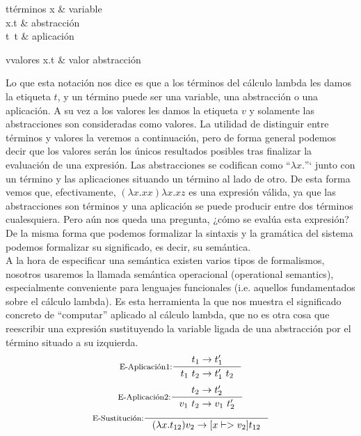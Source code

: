 \begin{grammar}{t}{términos}
x             & variable \\
\lambda x.t     & abstracción \\
t\ t           & aplicación
\end{grammar}

\begin{grammar}{v}{valores}
\lambda x.t     & valor abstracción
\end{grammar}

\bigskip

Lo que esta notación nos dice es que a los términos del cálculo lambda les damos la etiqueta $t$, y un término puede ser una variable, una abstracción o una aplicación.
A su vez a los valores les damos la etiqueta $v$ y solamente las abstracciones son consideradas como valores.
La utilidad de distinguir entre términos y valores la veremos a continuación, pero de forma general podemos decir que los valores serán los únicos resultados posibles
tras finalizar la evaluación de una expresión.
Las abstracciones se codifican como ``$\lambda x.$''` junto con un término y las aplicaciones situando un término al lado de otro. De esta forma vemos que, efectivamente, $(\lambda x.xx) \lambda x.xz$ es una expresión válida, ya que las abstracciones son términos y una aplicación se puede producir entre dos términos cualesquiera. Pero aún nos queda una pregunta, ¿cómo se evalúa esta expresión? De la misma forma que podemos formalizar la sintaxis y la gramática del sistema podemos formalizar su significado, es decir, su semántica.\\

A la hora de especificar una semántica existen varios tipos de formalismos, nosotros usaremos la llamada semántica operacional (operational semantics), especialmente conveniente para lenguajes funcionales (i.e. aquellos fundamentados sobre el cálculo lambda). Es esta herramienta la que nos muestra el significado concreto de ``computar'' aplicado al cálculo lambda, que no es otra cosa que reescribir una expresión sustituyendo la variable ligada de una abstracción por el término situado a su izquierda.\\

\[
\inference[E-Aplicación1:]{t_1 -> t_1'}{t_1\ t_2 -> t_1'\ t_2}\\
\]
\[
\inference[E-Aplicación2:]{t_2 -> t_2'}{v_1\ t_2 -> v_1\ t_2'}\\
\]
\[
\inference[E-Sustitución:]{}{(\lambda x.t_{12})v_2 -> [x |-> v_2]t_{12}}
\]
\bigskip

